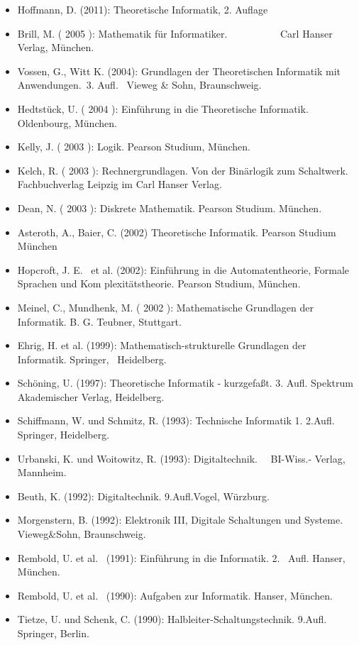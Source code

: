 \begin{itemize}
\item
  Hoffmann, D. (2011): Theoretische Informatik, 2. Auflage
\item
  Brill, M. ( 2005 ): Mathematik für Informatiker.~~~~~~~~~~ Carl Hanser
  Verlag, München.
\item
  Vossen, G., Witt K. (2004): Grundlagen der Theoretischen Informatik
  mit Anwendungen.~3. Aufl.~ Vieweg \& Sohn, Braunschweig.
\item
  Hedtstück, U. ( 2004 ): Einführung in die Theoretische Informatik.
  Oldenbourg, München.
\item
  Kelly, J. ( 2003 ): Logik. Pearson Studium, München.
\item
  Kelch, R. ( 2003 ): Rechnergrundlagen. Von der Binärlogik zum
  Schaltwerk. Fachbuchverlag Leipzig im Carl Hanser Verlag.
\item
  Dean, N. ( 2003 ): Diskrete Mathematik. Pearson Studium. München.
\item
  Asteroth, A., Baier, C. (2002) Theoretische Informatik. Pearson
  Studium München
\item
  Hopcroft, J. E.~ et al. (2002): Einführung in die Automatentheorie,
  Formale Sprachen und Kom plexitätstheorie. Pearson Studium, München.
\item
  Meinel, C., Mundhenk, M. ( 2002 ): Mathematische Grundlagen der
  Informatik. B. G. Teubner, Stuttgart.
\item
  Ehrig, H. et al. (1999): Mathematisch-strukturelle Grundlagen der
  Informatik. Springer,~ Heidelberg.
\item
  Schöning, U. (1997): Theoretische Informatik - kurzgefaßt. 3. Aufl.
  Spektrum Akademischer Verlag, Heidelberg.
\item
  Schiffmann, W. und Schmitz, R. (1993): Technische Informatik 1.
  2.Aufl. Springer, Heidelberg.
\item
  Urbanski, K. und Woitowitz, R. (1993): Digitaltechnik.~~ BI-Wiss.-
  Verlag, Mannheim.
\item
  Beuth, K. (1992): Digitaltechnik. 9.Aufl.Vogel, Würzburg.
\item
  Morgenstern, B. (1992): Elektronik III, Digitale Schaltungen und
  Systeme. Vieweg\&Sohn, Braunschweig.
\item
  Rembold, U. et al.~ (1991): Einführung in die Informatik. 2.~ Aufl.
  Hanser, München.~~~~~~~~~~~~~~~~~~~~~~~~~~~~~~~
\item
  Rembold, U. et al.~ (1990): Aufgaben zur Informatik. Hanser, München.
\item
  Tietze, U. und Schenk, C. (1990): Halbleiter-Schaltungstechnik.
  9.Aufl. Springer, Berlin.
\end{itemize}

